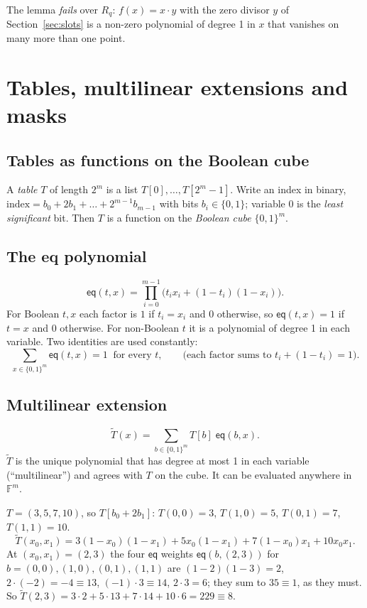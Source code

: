 \documentclass[11pt,a4paper]{article}
\newcommand{\Z}{\mathbb{Z}}
\newcommand{\Rq}{R_q}
\newcommand{\F}{\mathbb{F}}
\newcommand{\cube}[1]{\{0,1\}^{#1}}
\newcommand{\eq}{\mathsf{eq}}
\newcommand{\mle}[1]{\widetilde{#1}}
\theoremstyle{definition}
\theoremstyle{plain}
\begin{document}
The lemma \emph{fails} over $\Rq$: $f(x)=x\cdot y$ with the zero divisor $y$ of Section~\ref{sec:slots} is
a non-zero polynomial of degree 1 in $x$ that vanishes on many more than one point.

\section{Tables, multilinear extensions and masks}
\label{sec:mle}

\subsection{Tables as functions on the Boolean cube}

A \emph{table} $T$ of length $2^m$ is a list $T[0],\dots,T[2^m-1]$. Write an index in binary,
$\text{index}=b_0+2b_1+\dots+2^{m-1}b_{m-1}$ with bits $b_i\in\{0,1\}$; variable $0$ is the
\emph{least significant} bit. Then $T$ is a function on the \emph{Boolean cube} $\cube{m}$.

\subsection{The eq polynomial}

\[
  \eq(t,x)=\prod_{i=0}^{m-1}\bigl(t_ix_i+(1-t_i)(1-x_i)\bigr).
\]
For Boolean $t,x$ each factor is $1$ if $t_i=x_i$ and $0$ otherwise, so $\eq(t,x)=1$ if $t=x$ and $0$
otherwise. For non-Boolean $t$ it is a polynomial of degree 1 in each variable. Two identities are
used constantly:
\[
  \textstyle\sum_{x\in\cube{m}}\eq(t,x)=1\ \text{ for every } t, \qquad
  \text{(each factor sums to } t_i+(1-t_i)=1\text{)}.
\]

\subsection{Multilinear extension}

\[
  \mle{T}(x)=\sum_{b\in\cube{m}}T[b]\;\eq(b,x).
\]
$\mle T$ is the unique polynomial that has degree at most 1 in each variable (``multilinear'') and
agrees with $T$ on the cube. It can be evaluated anywhere in $\F^m$.

\begin{example}[A table of length 4 over $\Z_{17}$]
$T=(3,5,7,10)$, so $T[b_0+2b_1]$: $T(0,0)=3$, $T(1,0)=5$, $T(0,1)=7$, $T(1,1)=10$.
\[
 \mle T(x_0,x_1)=3(1-x_0)(1-x_1)+5x_0(1-x_1)+7(1-x_0)x_1+10x_0x_1 .
\]
At $(x_0,x_1)=(2,3)$ the four $\eq$ weights $\eq(b,(2,3))$ for $b=(0,0),(1,0),(0,1),(1,1)$ are
$(1-2)(1-3)=2$, $2\cdot(-2)=-4\equiv 13$, $(-1)\cdot 3\equiv 14$, $2\cdot 3=6$; they sum to
$35\equiv 1$, as they must. So $\mle T(2,3)=3\cdot 2+5\cdot 13+7\cdot 14+10\cdot 6=229\equiv 8$.
\end{example}
\end{document}
